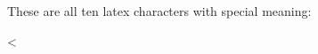 \documentclass{article}
\begin{document}
These are all ten latex characters with special meaning:

<%
\end{document}
